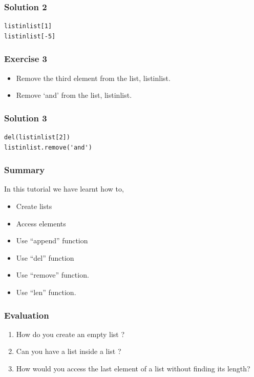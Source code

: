 \documentclass[17pt]{beamer}
\begin{document}
\begin{frame}[fragile]
\frametitle{Solution 2}
\lstset{language=Python}
\begin{lstlisting}
listinlist[1]
listinlist[-5]
\end{lstlisting}
\end{frame}
\begin{frame}
\frametitle{Exercise 3}
\begin{itemize}
\item Remove the third element from the list, listinlist.
\item Remove `and' from the list, listinlist.
\end{itemize}
\end{frame}
\begin{frame}[fragile]
\frametitle{Solution 3}
\lstset{language=Python}
\begin{lstlisting}
del(listinlist[2])
listinlist.remove('and')
\end{lstlisting}
\end{frame}
\begin{frame}[fragile]
	\frametitle{Summary}
	In this tutorial we have learnt how to,
    \begin{itemize}
        \item Create lists
        \item Access elements
        \item Use ``append'' function
        \item Use ``del'' function
        \item Use ``remove'' function.
        \item Use ``len'' function.
	\end{itemize}
\end{frame}
\begin{frame}[fragile]
	\frametitle{Evaluation}
	\begin{enumerate}
        \item How do you create an empty list ?
        \vspace{8pt}
        \item Can you have a list inside a list ?
        \vspace{8pt}
        \item How would you access the last element of a list without finding its length?
    \end{enumerate}
\end{frame}
\end{document}
